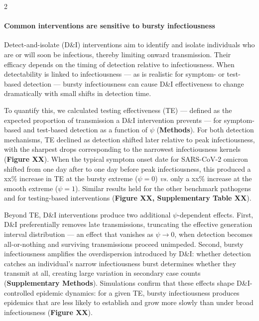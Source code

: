 \documentclass[10pt]{article}
\makeatletter
\newcommand{\vs}{\textit{vs.}\@\xspace}
\makeatother
\begin{document}
\begin{multicols}{2}
\paragraph{Common interventions are sensitive to bursty infectiousness} Detect-and-isolate (D\&I) interventions aim to identify and isolate individuals who are or will soon be infectious, thereby limiting onward transmission. Their efficacy depends on the timing of detection relative to infectiousness.\citep{fraser_factors_2004} When detectability is linked to infectiousness --- as is realistic for symptom- or test-based detection --- bursty infectiousness can cause D\&I effectiveness to change dramatically with small shifts in detection time. 

To quantify this, we calculated testing effectiveness (TE) --- defined as the expected proportion of transmission a D\&I intervention prevents \citep{middleton_modeling_2024} --- for symptom-based and test-based detection as a function of $\psi$ ({\bf Methods}). For both detection mechanisms, TE declined as detection shifted later relative to peak infectiousness, with the sharpest drops corresponding to the narrowest infectiousness kernels ({\bf Figure XX}). When the typical symptom onset date for SARS-CoV-2 omicron shifted from one day after to one day before peak infectiousness, this produced a xx\% increase in TE at the bursty extreme ($\psi = 0$) \vs only a xx\% increase at the smooth extreme ($\psi = 1$). Similar results held for the other benchmark pathogens and for testing-based interventions ({\bf Figure XX, Supplementary Table XX}). 

Beyond TE, D\&I interventions produce two additional $\psi$-dependent effects. First, D\&I preferentially removes late transmissions, truncating the effective generation interval distribution --- an effect that vanishes as $\psi \rightarrow 0$, when detection becomes all-or-nothing and surviving transmissions proceed unimpeded. Second, bursty infectiousness amplifies the overdispersion introduced by D\&I: whether detection catches an individual's narrow infectiousness burst determines whether they transmit at all, creating large variation in secondary case counts ({\bf Supplementary Methods}). Simulations confirm that these effects shape D\&I-controlled epidemic dynamics: for a given TE, bursty infectiousness produces epidemics that are less likely to establish and grow more slowly than under broad infectiousness ({\bf Figure XX}). 


\end{multicols}
\end{document}
